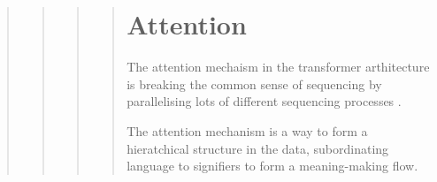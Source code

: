 \begin{quote}
\begin{quote}
\begin{quote}
\begin{quote}
{%
%
%
%
%

\section{Attention}

\begin{orangebox}
	The attention mechaism in the transformer arthitecture is breaking the common
	sense of sequencing by parallelising lots of different sequencing
	processes \parencite[5]{amoore2024}.
\end{orangebox}



The attention mechanism is a way to form a hieratchical structure in the data,
subordinating language to signifiers to form a meaning-making flow.

}
\end{quote}
\end{quote}
\end{quote}
\end{quote}
